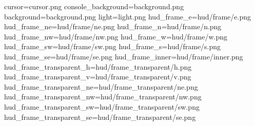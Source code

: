 cursor=cursor.png
console_background=background.png
background=background.png
light=light.png
hud_frame_e=hud/frame/e.png
hud_frame_ne=hud/frame/ne.png
hud_frame_n=hud/frame/n.png
hud_frame_nw=hud/frame/nw.png
hud_frame_w=hud/frame/w.png
hud_frame_sw=hud/frame/sw.png
hud_frame_s=hud/frame/s.png
hud_frame_se=hud/frame/se.png
hud_frame_inner=hud/frame/inner.png
hud_frame_transparent_h=hud/frame_transparent/h.png
hud_frame_transparent_v=hud/frame_transparent/v.png
hud_frame_transparent_ne=hud/frame_transparent/ne.png
hud_frame_transparent_nw=hud/frame_transparent/nw.png
hud_frame_transparent_sw=hud/frame_transparent/sw.png
hud_frame_transparent_se=hud/frame_transparent/se.png
